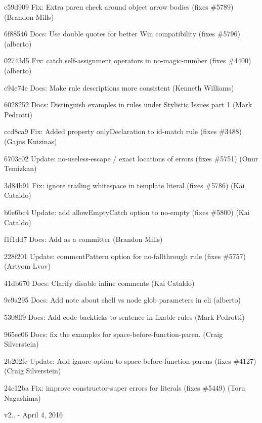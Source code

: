 \begin{DoxyItemize}
\item c59d909 Fix\+: Extra paren check around object arrow bodies (fixes \#5789) (Brandon Mills)
\item 6f88546 Docs\+: Use double quotes for better Win compatibility (fixes \#5796) (alberto)
\item 02743d5 Fix\+: catch self-\/assignment operators in {\ttfamily no-\/magic-\/number} (fixes \#4400) (alberto)
\item c94e74e Docs\+: Make rule descriptions more consistent (Kenneth Williams)
\item 6028252 Docs\+: Distinguish examples in rules under Stylistic Issues part 1 (Mark Pedrotti)
\item ccd8ca9 Fix\+: Added property only\+Declaration to id-\/match rule (fixes \#3488) (Gajus Kuizinas)
\item 6703c02 Update\+: no-\/useless-\/escape / exact locations of errors (fixes \#5751) (Onur Temizkan)
\item 3d84b91 Fix\+: ignore trailing whitespace in template literal (fixes \#5786) (Kai Cataldo)
\item b0e6bc4 Update\+: add allow\+Empty\+Catch option to no-\/empty (fixes \#5800) (Kai Cataldo)
\item f1f1dd7 Docs\+: Add  as a committer (Brandon Mills)
\item 228f201 Update\+: {\ttfamily comment\+Pattern} option for {\ttfamily no-\/fallthrough} rule (fixes \#5757) (Artyom Lvov)
\item 41db670 Docs\+: Clarify disable inline comments (Kai Cataldo)
\item 9c9a295 Docs\+: Add note about shell vs node glob parameters in cli (alberto)
\item 5308ff9 Docs\+: Add code backticks to sentence in fixable rules (Mark Pedrotti)
\item 965ec06 Docs\+: fix the examples for space-\/before-\/function-\/paren. (Craig Silverstein)
\item 2b202fc Update\+: Add ignore option to space-\/before-\/function-\/parens (fixes \#4127) (Craig Silverstein)
\item 24c12ba Fix\+: improve {\ttfamily constructor-\/super} errors for literals (fixes \#5449) (Toru Nagashima)
\end{DoxyItemize}

v2.. -\/ April 4, 2016


